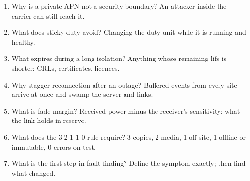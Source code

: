 \begin{enumerate}
\item Why is a private APN not a security boundary? An attacker inside the carrier can still reach it.
\item What does sticky duty avoid? Changing the duty unit while it is running and healthy.
\item What expires during a long isolation? Anything whose remaining life is shorter: CRLs, certificates, licences.
\item Why stagger reconnection after an outage? Buffered events from every site arrive at once and swamp the server and links.
\item What is fade margin? Received power minus the receiver's sensitivity: what the link holds in reserve.
\item What does the 3-2-1-1-0 rule require? 3 copies, 2 media, 1 off site, 1 offline or immutable, 0 errors on test.
\item What is the first step in fault-finding? Define the symptom exactly; then find what changed.
\end{enumerate}

